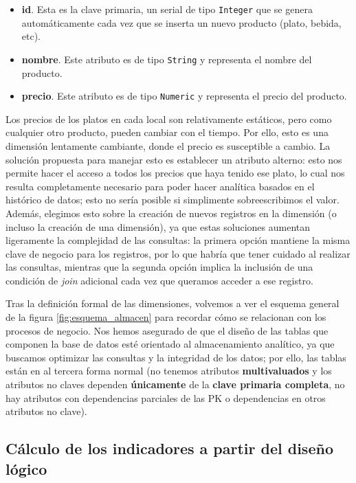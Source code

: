 \documentclass[12pt]{opticajnl}
\begin{document}
\begin{itemize}
\begin{itemize}
\item \textbf{id}. Esta es la clave primaria, un serial de tipo \texttt{Integer} que se genera automáticamente cada vez que se inserta un nuevo producto (plato, bebida, etc).
\item \textbf{nombre}. Este atributo es de tipo \texttt{String} y representa el nombre del producto.
\item \textbf{precio}. Este atributo es de tipo \texttt{Numeric} y representa el precio del producto.
\end{itemize}
Los precios de los platos en cada local son relativamente estáticos, pero como cualquier otro producto, pueden cambiar con el tiempo. Por ello, esto es una dimensión lentamente cambiante, donde el precio es susceptible a cambio. La solución propuesta para manejar esto es establecer un atributo alterno: esto nos permite hacer el acceso a todos los precios que haya tenido ese plato, lo cual nos resulta completamente necesario para poder hacer analítica basados en el histórico de datos; esto no sería posible si simplimente sobreescribimos el valor. Además, elegimos esto sobre la creación de nuevos registros en la dimensión (o incluso la creación de una dimensión), ya que estas soluciones aumentan ligeramente la complejidad de las consultas: la primera opción mantiene la misma clave de negocio para los registros, por lo que habría que tener cuidado al realizar las consultas, mientras que la segunda opción implica la inclusión de una condición de \textit{join} adicional cada vez que queramos acceder a ese registro.
\end{itemize}

Tras la definición formal de las dimensiones, volvemos a ver el esquema general de la figura \ref{fig:esquema_almacen} para recordar cómo se relacionan con los procesos de negocio. Nos hemos asegurado de que el diseño de las tablas que componen la base de datos esté orientado al almacenamiento analítico, ya que buscamos optimizar las consultas y la integridad de los datos; por ello, las tablas están en al tercera forma normal (no tenemos atributos \textbf{multivaluados} y los atributos no claves dependen \textbf{únicamente} de la \textbf{clave primaria completa}, no hay atributos con dependencias parciales de las PK o dependencias en otros atributos no clave).

\subsection{Cálculo de los indicadores a partir del diseño lógico} \label{sec:3c}
\end{document}
